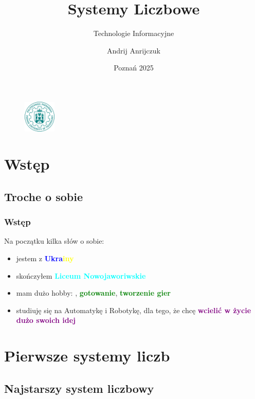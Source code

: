 \documentclass[12pt]{beamer}
\theoremstyle{plain}
\begin{document}
\title{Systemy Liczbowe}
\subtitle{Technologie Informacyjne}
\author{Andrij Anrijczuk}
\date{Poznań 2025}

\begin{frame}
\titlepage
\vspace{-0,6cm}
\begin{figure}[h]
    \centering
    \includegraphics[height=0.6in]{logopp.jpg}
    \end{figure}
\end{frame}

\begin{frame}
\tableofcontents
\end{frame}

\section{Wstęp}\label{sec:1}
\subsection{Troche o sobie}

\begin{frame}
\frametitle{Wstęp}
Na początku kilka  słów o sobie: \pause
\begin{itemize}
\item jestem z {\bf \textcolor{blue}{Ukra}}{\bf \textcolor{yellow}{iny}}  \pause
\item skończyłem {\bf \textcolor{cyan}{Liceum Nowojaworiwskie}}\pause
\item mam dużo hobby: \pause {\bf \textcolor{green}{pisarstwo}}\pause, {\bf \textcolor{green}{gotowanie}}\pause, {\bf \textcolor{green}{tworzenie gier}}\pause
\item studiuję się na Automatykę i Robotykę, dla tego, że chcę {\bf \textcolor{purple}{wcielić w życie dużo swoich idej}}
\end{itemize}
\end{frame}

\section{Pierwsze systemy liczb}
\subsection{Najstarszy system liczbowy}
\end{document}
